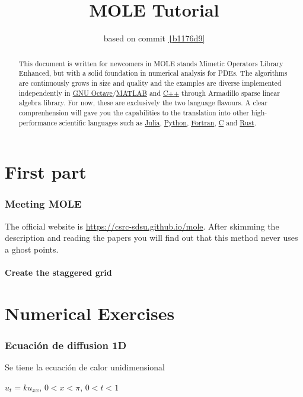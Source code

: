 \documentclass[a4paper,abstract=true]{scrreprt}
\title{\color{DarkBlue}MOLE Tutorial}
\author{based on commit \href{https://github.com/csrc-sdsu/mole/tree/b1176d9969e807fb62bed8fee28bc0eb9648a93a}{\texttt|b1176d9|}}
\begin{document}
\maketitle

\begin{abstract}
    This document is written for newcomers in MOLE stands
    Mimetic Operators Library Enhanced, but with a solid foundation
    in numerical analysis for PDEs.
    The algorithms are continuously grows in size and quality and the
    examples are diverse implemented independently in
    \href{https://octave.org}{GNU Octave}/\href{https://www.mathworks.com/products/matlab.html}{MATLAB}
    and \href{https://isocpp.org}{C++} through Armadillo sparse
    linear algebra library.
    For now, these are exclusively the two language flavours.
    A clear comprenhension will gave you the capabilities to the translation
    into other high-performance scientific languages such as \href{https://julialang.org}{Julia},
    \href{https://www.python.org}{Python}, \href{https://fortran-lang.org}{Fortran}, \href{https://www.open-std.org/jtc1/sc22/wg14}{C}
    and \href{https://www.rust-lang.org}{Rust}.
\end{abstract}

\part{First part}

\section{Meeting MOLE}

The official website is \url{https://csrc-sdsu.github.io/mole}.
After skimming the description and reading the papers you will find out that this method never uses a ghost points.

\subsection{Create the staggered grid}


\part{Numerical Exercises}

\section{Ecuación de diffusion 1D}
Se tiene  la ecuación de calor unidimensional
\begin{center}
$u_{t} = k  u_{xx} $, $0 < x < \pi$, $0 < t< 1$	
\end{center}
\end{document}
